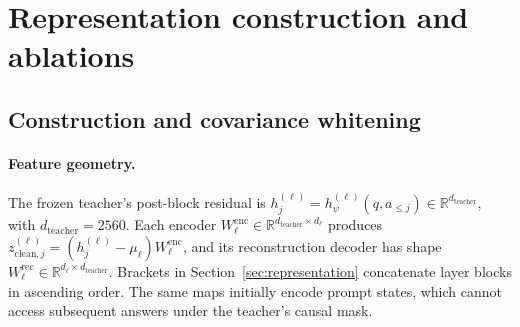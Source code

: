 \documentclass[11pt,letterpaper]{article}
\newcommand{\R}{\mathbb{R}}
\begin{document}
\section{Representation construction and ablations}
\label{app:representationimplementation}

\subsection{Construction and covariance whitening}
\label{app:representationgeometry}

\paragraph{Feature geometry.}
The frozen teacher's post-block residual is $h_j^{(\ell)}=h_\psi^{(\ell)}(q,a_{\leq j})\in\R^{d_{\mathrm{teacher}}}$, with $d_{\mathrm{teacher}}=2560$. Each encoder $W_\ell^{\mathrm{enc}}\in\R^{d_{\mathrm{teacher}}\times d_\ell}$ produces $z_{\mathrm{clean},j}^{(\ell)}=(h_j^{(\ell)}-\mu_\ell)W_\ell^{\mathrm{enc}}$, and its reconstruction decoder has shape $W_\ell^{\mathrm{rec}}\in\R^{d_\ell\times d_{\mathrm{teacher}}}$. Brackets in Section~\ref{sec:representation} concatenate layer blocks in ascending order. The same maps initially encode prompt states, which cannot access subsequent answers under the teacher's causal mask.
\end{document}

